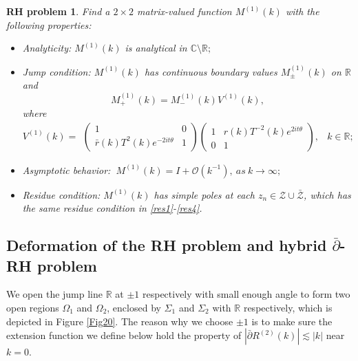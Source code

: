 \documentclass[11pt]{article}
\numberwithin{equation}{section}
\newtheorem{RHP}{RH problem}
\begin{document}
\begin{RHP}
    Find a $2\times 2$ matrix-valued function $M^{(1)}(k)$ with the following properties:
\begin{itemize}
  \item Analyticity: $M^{(1)}(k)$ is analytical in $\mathbb{C}\setminus\mathbb{R};$

  \item Jump condition: $M^{(1)}(k)$ has continuous boundary values $M^{(1)}_{\pm}(k)$ on $\mathbb{R}$ and
 \begin{equation*}
M^{(1)}_+(k)=M^{(1)}_-(k)V^{(1)}(k),
\end{equation*}
where
\begin{equation}
V^{(1)}(k)=\begin{array}{ll}
\left(\begin{array}{cc}1&0\\ \bar{r}(k)T^2(k)e^{-2it\theta}&1\end{array}\right)
\left(\begin{array}{cc}1&r(k)T^{-2}(k)e^{2it\theta}\\ 0&1\end{array}\right), &k\in \mathbb{R};
\end{array}
\end{equation}


  \item Asymptotic behavior:
  $\ M^{(1)}(k)=I+\mathcal{O}(k^{-1}),\ as \ k\to \infty;$
\item Residue condition: $M^{(1)}(k)$ has simple poles at each $z_n\in\mathcal{Z}\cup\bar{\mathcal{Z}}$, which  has the same residue condition in \eqref{res1}-\eqref{res4}.
\end{itemize}
\end{RHP}

\subsection{Deformation of the RH problem and hybrid \texorpdfstring{$\bar{\partial}$}{\bar{\partial}}-RH problem}\label{sec5.1}
We open the jump line $\mathbb{R}$ at $\pm1$ respectively with small enough angle to form two open regions $\Omega_1$ and $\Omega_2$, enclosed by $\Sigma_1$ and $\Sigma_2$ with $\mathbb{R}$ respectively, which is depicted in Figure \ref{Fig20}. The reason why we choose $\pm1$ is to make sure the extension function we define below hold the property of $|\bar\partial R^{(2)}(k)|\lesssim|k|$ near $k=0.$
\end{document}
